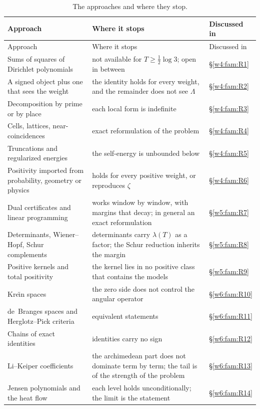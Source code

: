 \documentclass[11pt]{amsart}
\theoremstyle{definition}
\theoremstyle{remark}
\numberwithin{equation}{section}
\newcommand{\lam}{\lambda(T)}                          %
\begin{document}
{\small
\setlength{\tabcolsep}{4pt}
\begin{longtable}{>{\raggedright}p{4.1cm}>{\raggedright}p{7.6cm}>{\raggedright\arraybackslash}p{2.2cm}}
\caption{The approaches and where they stop.}\label{w8:tab:master}\\
\toprule
Approach & Where it stops & Discussed in\\\midrule\endfirsthead
\toprule
Approach & Where it stops & Discussed in\\\midrule\endhead
\bottomrule\endfoot
Sums of squares of Dirichlet polynomials & not available for $T\ge\frac12\log3$; open in between & \S\ref{w4:fam:R1}\\
A signed object plus one that sees the weight & the identity holds for every weight, and the remainder does not see $\Lambda$ & \S\ref{w4:fam:R2}\\
Decomposition by prime or by place & each local form is indefinite & \S\ref{w4:fam:R3}\\
Cells, lattices, near-coincidences & exact reformulation of the problem & \S\ref{w4:fam:R4}\\
Truncations and regularized energies & the self-energy is unbounded below & \S\ref{w4:fam:R5}\\
Positivity imported from probability, geometry or physics & holds for every positive weight, or reproduces $\zeta$ & \S\ref{w4:fam:R6}\\
Dual certificates and linear programming & works window by window, with margins that decay; in general an exact reformulation & \S\ref{w5:fam:R7}\\
Determinants, Wiener--Hopf, Schur complements & determinants carry $\lam$ as a factor; the Schur reduction inherits the margin & \S\ref{w5:fam:R8}\\
Positive kernels and total positivity & the kernel lies in no positive class that contains the models & \S\ref{w5:fam:R9}\\
Kre\u{\i}n spaces & the zero side does not control the angular operator & \S\ref{w6:fam:R10}\\
de~Branges spaces and Herglotz--Pick criteria & equivalent statements & \S\ref{w6:fam:R11}\\
Chains of exact identities & identities carry no sign & \S\ref{w6:fam:R12}\\
Li--Keiper coefficients & the archimedean part does not dominate term by term; the tail is of the strength of the problem & \S\ref{w6:fam:R13}\\
Jensen polynomials and the heat flow & each level holds unconditionally; the limit is the statement & \S\ref{w6:fam:R14}\\

\end{longtable}}
\end{document}
